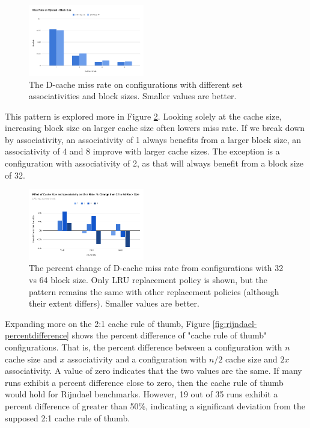 \documentclass[conference]{IEEEtran}
\begin{document}
\begin{figure}[H]
  \centering
  \includegraphics[width=0.45\textwidth]{images/rijndael_blocksize.png}
  \caption{The D-cache miss rate on configurations with different set associativities and block sizes. Smaller values are better.}
  \label{fig:rijndael-blocksize}
\end{figure}

This pattern is explored more in Figure \ref{fig:rijndael-missrate-percentchange}. Looking solely at the cache size, increasing block size on larger cache size often lowers miss rate. If we break down by associativity, an associativity of 1 always benefits from a larger block size, an associativity of 4 and 8 improve with larger cache sizes. The exception is a configuration with associativity of 2, as that will always benefit from a block size of 32.

\begin{figure}[H]
  \centering
  \includegraphics[width=0.45\textwidth]{images/rijndael_missrate_percentchange.png}
  \caption{The percent change of D-cache miss rate from configurations with 32 vs 64 block size. Only LRU replacement policy is shown, but the pattern remains the same with other replacement policies (although their extent differs). Smaller values are better.}
  \label{fig:rijndael-missrate-percentchange}
\end{figure}

Expanding more on the 2:1 cache rule of thumb, Figure \ref{fig:rijndael-percentdifference} shows the percent difference of "cache rule of thumb" configurations. That is, the percent difference between a configuration with $n$ cache size and $x$ associativity and a configuration with $n/2$ cache size and $2x$ associativity. A value of zero indicates that the two values are the same. If many runs exhibit a percent difference close to zero, then the cache rule of thumb would hold for Rijndael benchmarks. However, 19 out of 35 runs exhibit a percent difference of greater than 50\%, indicating a significant deviation from the supposed 2:1 cache rule of thumb.
\end{document}
